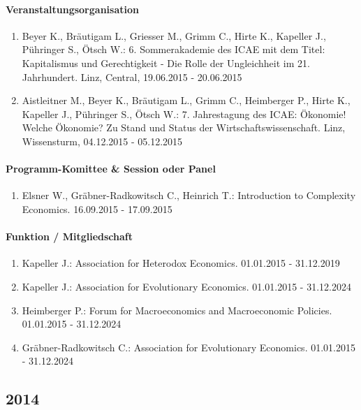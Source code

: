 \paragraph{Veranstaltungsorganisation}
\begin{enumerate}[leftmargin=*, labelsep=0.5cm]
\item Beyer K., Bräutigam L., Griesser M., Grimm C., Hirte K., Kapeller J., Pühringer S., Ötsch W.: 6. Sommerakademie des ICAE mit dem Titel: Kapitalismus und Gerechtigkeit - Die Rolle der Ungleichheit im 21. Jahrhundert. Linz, Central, 19.06.2015 - 20.06.2015
\item Aistleitner M., Beyer K., Bräutigam L., Grimm C., Heimberger P., Hirte K., Kapeller J., Pühringer S., Ötsch W.: 7. Jahrestagung des ICAE: Ökonomie! Welche Ökonomie? Zu Stand und Status der Wirtschaftswissenschaft. Linz, Wissensturm, 04.12.2015 - 05.12.2015
\end{enumerate}

\paragraph{Programm-Komittee \& Session oder Panel}
\begin{enumerate}[leftmargin=*, labelsep=0.5cm]
\item Elsner W., Gräbner-Radkowitsch C., Heinrich T.: Introduction to Complexity Economics. 16.09.2015 - 17.09.2015
\end{enumerate}

\paragraph{Funktion / Mitgliedschaft}
\begin{enumerate}[leftmargin=*, labelsep=0.5cm]
\item Kapeller J.: Association for Heterodox Economics. 01.01.2015 - 31.12.2019
\item Kapeller J.: Association for Evolutionary Economics. 01.01.2015 - 31.12.2024
\item Heimberger P.: Forum for Macroeconomics and Macroeconomic Policies. 01.01.2015 - 31.12.2024
\item Gräbner-Radkowitsch C.: Association for Evolutionary Economics. 01.01.2015 - 31.12.2024
\end{enumerate}
\subsection*{2014}
